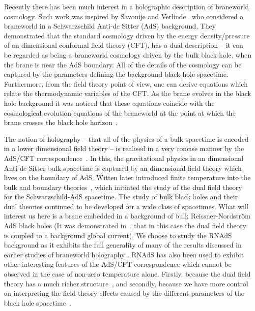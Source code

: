 \documentclass[a4paper,12pt]{article}
\begin{document}
Recently there has been much interest in a holographic description of
braneworld cosmology.  Such work was inspired by Savonije and
Verlinde~\cite{Verlinde:radiation,Savonije:braneCFT} who considered a
braneworld in a Schwarzschild Anti-de Sitter (AdS) background.  They
demonstrated that the standard cosmology driven by the energy
density/pressure of an  \coordHE{} dimensional conformal field theory
(CFT), has a dual description -- it can be regarded as being a
braneworld cosmology driven by the bulk black hole, when the brane is
near the AdS boundary. All of the details of the cosmology can be
captured by the parameters defining the background black hole
spacetime.  Furthermore, from the field theory point of view, one can
derive equations which relate the thermodynamic variables of the CFT.
As the brane evolves in the black hole background it was noticed that
these equations coincide with the cosmological evolution equations of
the braneworld at the point at which the brane crosses the black hole
horizon~\cite{Verlinde:radiation,Savonije:braneCFT}.

The notion of holography -- that all of the physics of a bulk
spacetime is encoded in a lower dimensional field theory -- is
realised in a very concise manner by the AdS/CFT
correspondence~\cite{Maldacena:adscft,Witten:adscft,Gubser:adscft}.
In this, the gravitational physics in an \coordHE{} dimensional Anti-de
Sitter bulk spacetime is captured by an \coordHE{} dimensional field
theory which lives on the boundary of AdS.  Witten later introduced
finite temperature into the bulk and boundary
theories~\cite{Witten:thermal}, which initiated the study of the dual
field theory for the Schwarzschild-AdS spacetime.  The study of bulk
black holes and their dual theories continued to be developed for a
wide class of spacetimes.  What will interest us here is a brane
embedded in a background of bulk Reissner-Nordstr\"om AdS black holes
(It was demonstrated in~\cite{Chamblin:charge1}, that in this case the
dual field theory is coupled to a background global current).  We
choose to study the RNAdS background as it exhibits the full
generality of many of the results discussed in earlier studies of
braneworld holography
\cite{Csaki:cosmoconst1,Csaki:cosmoconst2,Cai:chargedcardy,Biswas:stiffmatter,Myung:branecos,Cai:chargedbg,Youm:chargedcardy,Wang:branecos,Creminelli:holography}.
RNAdS has also been used to exhibit other interesting features of the
AdS/CFT correspondence which cannot be observed in the case of
non-zero temperature alone.  Firstly, because the dual field theory
has a much richer
structure~\cite{Chamblin:charge2,Evans:superfluidity}, and secondly,
because we have more control on interpreting the field theory effects
caused by the different parameters of the black hole
spacetime~\cite{Gregory:horizons}.
\end{document}
